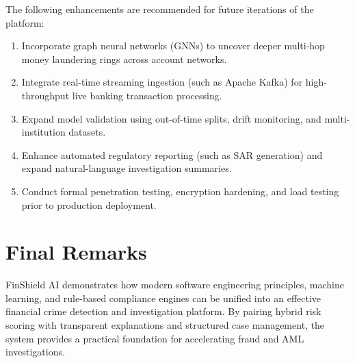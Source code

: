 \documentclass{tietreport}
\begin{document}
The following enhancements are recommended for future iterations of the platform:

\begin{enumerate}
  \item Incorporate graph neural networks (GNNs) to uncover deeper
  multi-hop money laundering rings across account networks.
  \item Integrate real-time streaming ingestion (such as Apache Kafka)
  for high-throughput live banking transaction processing.
  \item Expand model validation using out-of-time splits, drift
  monitoring, and multi-institution datasets.
  \item Enhance automated regulatory reporting (such as SAR generation)
  and expand natural-language investigation summaries.
  \item Conduct formal penetration testing, encryption hardening, and
  load testing prior to production deployment.
\end{enumerate}

\section{Final Remarks}

FinShield AI demonstrates how modern software engineering principles,
machine learning, and rule-based compliance engines can be unified into an
effective financial crime detection and investigation platform. By pairing
hybrid risk scoring with transparent explanations and structured case
management, the system provides a practical foundation for accelerating
fraud and AML investigations.

\printbibliography
\end{document}
